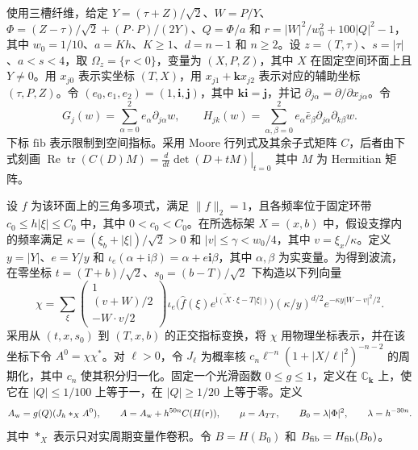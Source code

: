 使用三槽纤维，给定 $Y=(\tau+Z)/\sqrt 2$、$W=P/Y$、$\Phi=(Z-\tau)/\sqrt 2+(P\cdot P)/(2Y)$、$Q=\Phi/a$ 和 $r=|W|^2/w_0^2+100|Q|^2-1$，其中 $w_0=1/10$、$a=Kh$、$K\ge1$、$d=n-1$ 和 $n\ge2$。设 $z=(T,\tau)$、$s=|\tau|$、$a<s<4$，取 $\Omega_z=\{r<0\}$，变量为 $(X,P,Z)$，其中 $X$ 在固定空间环面上且 $Y\ne0$。用 $x_{j0}$ 表示实坐标 $(T,X)$，用 $x_{j1}+\mathbf kx_{j2}$ 表示对应的辅助坐标 $(\tau,P,Z)$。令 $(e_0,e_1,e_2)=(1,\mathbf i,\mathbf j)$，其中 $\mathbf k\mathbf i=\mathbf j$，并记 $\partial_{j\alpha}=\partial/\partial x_{j\alpha}$。令
\[
 G_j(w)=\sum_{\alpha=0}^2 e_\alpha\partial_{j\alpha}w,\qquad
 H_{jk}(w)=\sum_{\alpha,\beta=0}^2 e_\alpha\bar e_\beta\partial_{j\alpha}\partial_{k\beta}w .
\]
下标 $\mathrm{fib}$ 表示限制到空间指标。采用 Moore 行列式及其余子式矩阵 $C$，后者由下式刻画
$\operatorname{Re}\operatorname{tr}(C(D)M)=\left.\frac{d}{dt}\det(D+tM)\right|_{t=0}$
其中 $M$ 为 Hermitian 矩阵。

设 $f$ 为该环面上的三角多项式，满足 $\|f\|_2=1$，且各频率位于固定环带 $c_0\le h|\xi|\le C_0$ 中，其中 $0<c_0<C_0$。在所选标架 $X=(x,b)$ 中，假设支撑内的频率满足 $\kappa=(\xi_b+|\xi|)/\sqrt2>0$ 和 $|v|\le\gamma<w_0/4$，其中 $v=\xi_x/\kappa$。定义 $y=|Y|$、$e=Y/y$ 和 $\iota_e(\alpha+\mathrm i\beta)=\alpha+e\mathbf i\beta$，其中 $\alpha,\beta$ 为实变量。为得到波流，在零坐标 $t=(T+b)/\sqrt2$、$s_0=(b-T)/\sqrt2$ 下构造以下列向量
\[
 \chi=\sum_{\xi}
 \begin{pmatrix}1\\(v+W)/2\\-W\cdot v/2\end{pmatrix}
 \iota_e\!\bigl(\overline{\widehat f(\xi)e^{\mathrm i(X\cdot\xi-T|\xi|)}}\bigr)
 (\kappa/y)^{d/2}e^{-\kappa y|W-v|^2/2}.
\]
采用从 $(t,x,s_0)$ 到 $(T,x,b)$ 的正交指标变换，将 $\chi$ 用物理坐标表示，并在该坐标下令 $A^0=\chi\chi^*$。对 $\ell>0$，令 $J_\ell$ 为概率核 $c_n\ell^{-n}(1+|X/\ell|^2)^{-n-2}$ 的周期化，其中 $c_n$ 使其积分归一化。固定一个光滑函数 $0\le g\le1$，定义在 $\mathbb C_{\mathbf k}$ 上，使它在 $|Q|\le1/100$ 上等于一，在 $|Q|\ge1/20$ 上等于零。定义
\[
 A_{\rm w}=g(Q)(J_h*_X A^0),\qquad A=A_{\rm w}+h^{50n}C(H(r)),\qquad
 \mu=A_{TT},\qquad B_0=\lambda|\Phi|^2,\qquad\lambda=h^{-30n}.
\]
其中 $*_X$ 表示只对实周期变量作卷积。令 $B=H(B_0)$ 和 $B_{\rm fib}=H_{\rm fib}(B_0)$。

